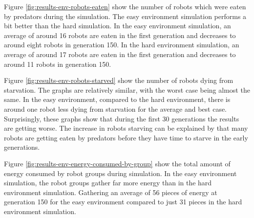Figure \ref{fig:results-env-robots-eaten} show the number of robots which were eaten by predators during the simulation.
The easy environment simulation performs a bit better than the hard simulation.
In the easy environment simulation, an average of around 16 robots are eaten in the first generation and decreases to around eight robots in generation 150.
In the hard environment simulation, an average of around 17 robots are eaten in the first generation and decreases to around 11 robots in generation 150.

\vspace*{\fill}
\newpage
\vspace*{\fill}


Figure \ref{fig:results-env-robots-starved} show the number of robots dying from starvation.
The graphs are relatively similar, with the worst case being almost the same.
In the easy environment, compared to the hard environment, there is around one robot less dying from starvation for the average and best case.
Surprisingly, these graphs show that during the first 30 generations the results are getting worse.
The increase in robots starving can be explained by that many robots are getting eaten by predators before they have time to starve in the early generations.  

\vspace*{\fill}
\newpage
\vspace*{\fill}


Figure \ref{fig:results-env-energy-consumed-by-group} show the total amount of energy consumed by robot groups during simulation.
In the easy environment simulation, the robot groups gather far more energy than in the hard environment simulation.
Gathering an average of 56 pieces of energy at generation 150 for the easy environment compared to just 31 pieces in the hard environment simulation.

\vspace*{\fill}
\newpage
\vspace*{\fill}

